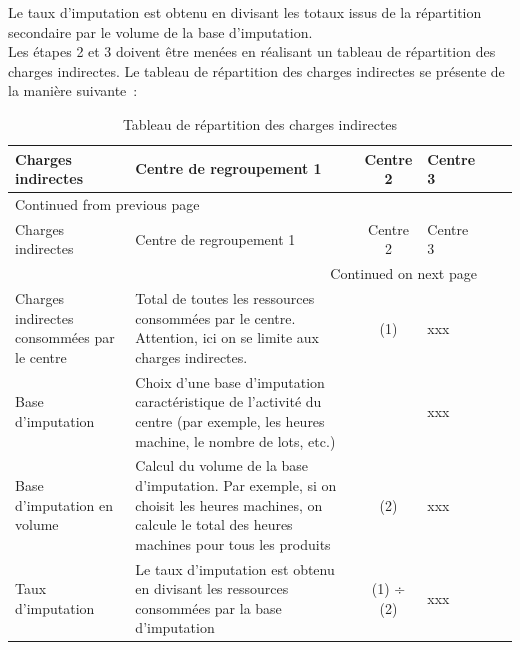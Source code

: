 \documentclass{kaobook}
\begin{document}
Le taux d'imputation est obtenu en divisant les totaux issus de la répartition secondaire par le volume de la base d'imputation.\\
Les étapes 2 et 3 doivent être menées en réalisant un tableau de répartition des charges indirectes. Le tableau de répartition des charges indirectes se présente de la manière suivante :\\
\begin{longtable}{p{4cm} p{8cm} cp{3cm} cp{3cm}}
\caption{Tableau de répartition des charges indirectes}
\\
Charges indirectes & Centre de regroupement 1 & Centre 2 & Centre 3\\
\hline
\endfirsthead
\multicolumn{4}{l}{Continued from previous page} \\
\hline

Charges indirectes & Centre de regroupement 1 & Centre 2 & Centre 3 \\

\hline
\endhead
\hline\multicolumn{4}{r}{Continued on next page} \\
\endfoot
\endlastfoot
\hline
Charges indirectes consommées par le centre & Total de toutes les ressources consommées par le centre. Attention, ici on se limite aux charges indirectes. & (1) & xxx\\
Base d'imputation & Choix d'une base d'imputation caractéristique de l'activité du centre (par exemple, les heures machine, le nombre de lots, etc.) &  & xxx\\
Base d'imputation en volume & Calcul du volume de la base d'imputation. Par exemple, si on choisit les heures machines, on calcule le total des heures machines pour tous les produits & (2) & xxx\\
Taux d'imputation & Le taux d'imputation est obtenu en divisant les ressources consommées par la base d'imputation & (1) ÷ (2) & xxx\\
\end{longtable}
\end{document}
